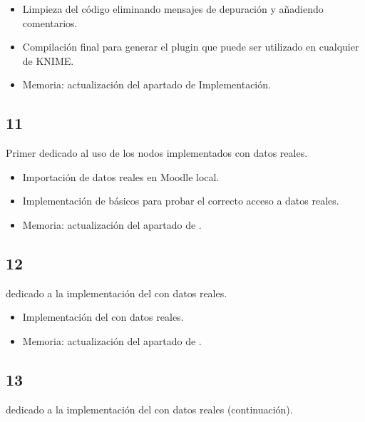 \begin{itemize}
	\item Limpieza del código eliminando mensajes de depuración y añadiendo comentarios.
	\item Compilación final para generar el plugin que puede ser utilizado en cualquier  de KNIME. 
	\item Memoria: actualización del apartado de Implementación. 
\end{itemize}



\subsection{ 11}

Primer  dedicado al uso de los nodos implementados con datos reales. 

\begin{itemize}
	\item Importación de datos reales en Moodle local. 
	\item Implementación de  básicos para probar el correcto acceso a datos reales. 
	\item Memoria: actualización del apartado de . 
\end{itemize}




\subsection{ 12}

 dedicado a la implementación del  con datos reales. 

\begin{itemize}
	\item Implementación del  con datos reales. 
	\item Memoria: actualización del apartado de . 
\end{itemize}



\subsection{ 13}

 dedicado a la implementación del  con datos reales (continuación). 


